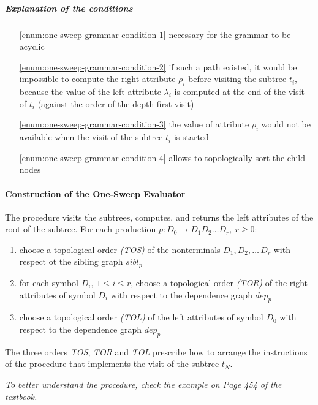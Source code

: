 \documentclass[english]{article}
\begin{document}
\subparagraph*{Explanation of the conditions}

\begin{enumerate}
  \item[\ref{enum:one-sweep-grammar-condition-1}] necessary for the grammar to be acyclic
  \item[\ref{enum:one-sweep-grammar-condition-2}] if such a path existed, it would be impossible to compute the right attribute \(\rho_i\) before visiting the subtree \(t_i\), because the value of the left attribute \(\lambda_i\) is computed at the end of the visit of \(t_i\) (against the order of the depth-first visit)
  \item[\ref{enum:one-sweep-grammar-condition-3}] the value of attribute \(\rho_i\) would not be available when the visit of the subtree \(t_i\) is started
  \item[\ref{enum:one-sweep-grammar-condition-4}] allows to topologically sort the child nodes
\end{enumerate}

\paragraph{Construction of the One-Sweep Evaluator}

The procedure visits the subtrees, computes, and returns the left attributes of the root of the subtree.
For each production \(p : D_0 \rightarrow D_1 D_2 \ldots D_r, \ r \geq 0\):

\begin{enumerate}
  \item choose a topological order \textit{(TOS)} of the nonterminals \(D_1, D_2, \ldots \, D_r\) with respect ot the sibling graph \(\textit{sibl}_p\)
  \item for each symbol \(D_i, \ 1 \leq i \leq r\), choose a topological order \textit{(TOR)} of the right attributes of symbol \(D_i\) with respect to the dependence graph \(\textit{dep}_p\)
  \item choose a topological order \textit{(TOL)} of the left attributes of symbol \(D_0\) with respect to the dependence graph \(\textit{dep}_p\)
\end{enumerate}

The three orders \textit{TOS}, \textit{TOR} and \textit{TOL} prescribe how to arrange the instructions of the procedure that implements the visit of the subtree \(t_N\).

\bigskip
\textit{To better understand the procedure, check the example on Page 454 of the textbook.}
\end{document}
